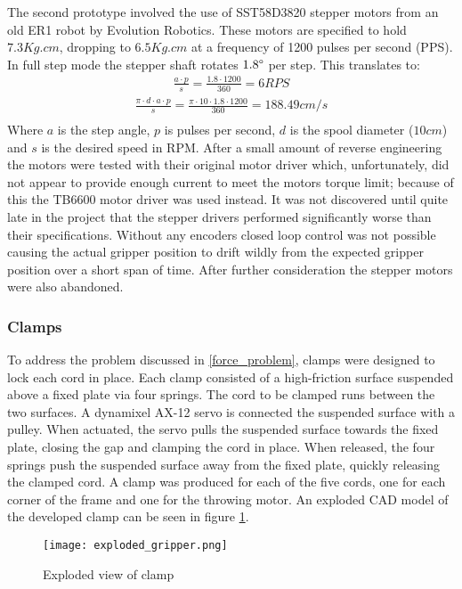 \documentclass[conference]{IEEEtran}
\begin{document}
The second prototype involved the use of SST58D3820 stepper motors from an old ER1 robot by Evolution Robotics. These motors are specified to hold $7.3Kg.cm$, dropping to $6.5Kg.cm$ at a frequency of 1200 pulses per second (PPS). In full step mode the stepper shaft rotates $1.8\degree$ per step. This translates to: \begin{equation}
\begin{aligned}
\frac{a\cdot p}{s} = \frac{1.8\cdot 1200}{360} = 6 RPS
\end{aligned}
\end{equation}
\begin{equation}
\begin{aligned}
\frac{\pi\cdot d\cdot a\cdot p}{s} = \frac{\pi \cdot 10 \cdot 1.8 \cdot 1200}{360} = 188.49 cm/s\\ 
\end{aligned}
\end{equation} Where $a$ is the step angle, $p$ is pulses per second, $d$ is the spool diameter ($10cm$) and $s$ is the desired speed in RPM. After a small amount of reverse engineering the motors were tested with their original motor driver which, unfortunately, did not appear to provide enough current to meet the motors torque limit; because of this the TB6600 motor driver was used instead. It was not discovered until quite late in the project that the stepper drivers performed significantly worse than their specifications. Without any encoders closed loop control was not possible causing the actual gripper position to drift wildly from the expected gripper position over a short span of time. After further consideration the stepper motors were also abandoned.


\subsubsection{Clamps}
To address the problem discussed in \ref{force_problem}, clamps were designed to lock each cord in place. Each clamp consisted of a high-friction surface suspended above a fixed plate via four springs. The cord to be clamped runs between the two surfaces. A dynamixel AX-12 servo is connected the suspended surface with a pulley. When actuated, the servo pulls the suspended surface towards the fixed plate, closing the gap and clamping the cord in place. When released, the four springs push the suspended surface away from the fixed plate, quickly releasing the clamped cord. A clamp was produced for each of the five cords, one for each corner of the frame and one for the throwing motor. An exploded CAD model of the developed clamp can be seen in figure \ref{explodedClamp}.
\begin{figure}\label{explodedClamp}
	\centering
	
	\texttt{[image: exploded\_gripper.png]}
	\caption{Exploded view of clamp}
\end{figure}        
\end{document}
